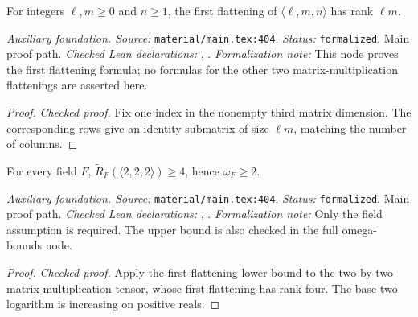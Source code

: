 \renewcommand{\thetheorem}{A39}
\begin{lemma}
\label{aux:matrix-multiplication-flattening}
\leanok
For integers $\ell,m\ge0$ and $n\ge1$, the first flattening of $\langle\ell,m,n\rangle$ has rank $\ell m$.
\end{lemma}

\noindent\textit{Auxiliary foundation. Source:} \texttt{material/main.tex:404}.
\textit{Status:} \texttt{formalized}. Main proof path.
\textit{Checked Lean declarations:} , .
\textit{Formalization note:} This node proves the first flattening formula; no formulas for the other two matrix-multiplication flattenings are asserted here.

\begin{proof}
\leanok
{}
\textit{Checked proof.} Fix one index in the nonempty third matrix dimension. The corresponding rows give an identity submatrix of size $\ell m$, matching the number of columns.
\end{proof}

\renewcommand{\thetheorem}{A40}
\begin{lemma}
\label{aux:omega-lower-bound}
\leanok
For every field $F$, $\widetilde R_F(\langle2,2,2\rangle)\ge4$, hence $\omega_F\ge2$.
\end{lemma}

\noindent\textit{Auxiliary foundation. Source:} \texttt{material/main.tex:404}.
\textit{Status:} \texttt{formalized}. Main proof path.
\textit{Checked Lean declarations:} , .
\textit{Formalization note:} Only the field assumption is required. The upper bound is also checked in the full omega-bounds node.

\begin{proof}
\leanok
{}
\textit{Checked proof.} Apply the first-flattening lower bound to the two-by-two matrix-multiplication tensor, whose first flattening has rank four. The base-two logarithm is increasing on positive reals.
\end{proof}

